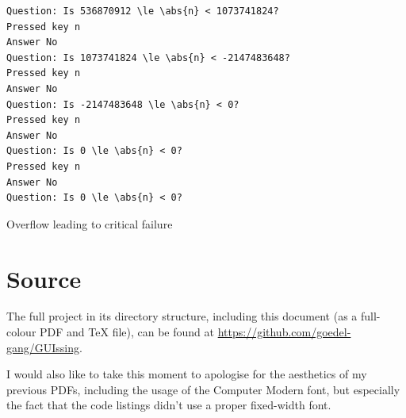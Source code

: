 \documentclass[a4paper,11pt]{article}
\newenvironment{longlisting}
{\addvspace{\baselineskip}\captionsetup{type=listing}}
{\addvspace{\baselineskip}}
\begin{document}
\begin{longlisting}
\begin{verbatim}
Question: Is 536870912 \le \abs{n} < 1073741824?
Pressed key n
Answer No
Question: Is 1073741824 \le \abs{n} < -2147483648?
Pressed key n
Answer No
Question: Is -2147483648 \le \abs{n} < 0?
Pressed key n
Answer No
Question: Is 0 \le \abs{n} < 0?
Pressed key n
Answer No
Question: Is 0 \le \abs{n} < 0?
\end{verbatim}
\caption{Overflow leading to critical failure}\label{lst:overflow}
\end{longlisting}

    \section{Source}

    The full project in its directory structure, including this document (as a
    full-colour PDF and \TeX{} file), can be found at
    \url{https://github.com/goedel-gang/GUIssing}.

    I would also like to take this moment to apologise for the aesthetics of my
    previous PDFs, including the usage of the Computer Modern font, but
    especially the fact that the code listings didn't use a proper fixed-width
    font.
\end{document}

